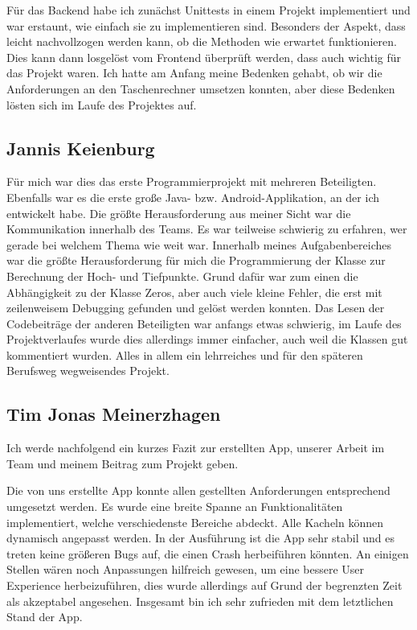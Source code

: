 Für das Backend habe ich zunächst Unittests in einem Projekt implementiert und war erstaunt, wie einfach sie zu implementieren sind. Besonders der Aspekt, dass leicht nachvollzogen werden kann, ob die Methoden wie erwartet funktionieren. Dies kann dann losgelöst vom Frontend überprüft werden, dass auch wichtig für das Projekt waren.
Ich hatte am Anfang meine Bedenken gehabt, ob wir die Anforderungen an den Taschenrechner umsetzen konnten, aber diese Bedenken lösten sich im Laufe des Projektes auf.

\clearpage

\subsection{Jannis Keienburg}
Für mich war dies das erste Programmierprojekt mit mehreren Beteiligten. Ebenfalls war es die erste große Java- bzw. Android-Applikation, an der ich entwickelt habe. Die größte Herausforderung aus meiner Sicht war die Kommunikation innerhalb des Teams. Es war teilweise schwierig zu erfahren, wer gerade bei welchem Thema wie weit war. Innerhalb meines Aufgabenbereiches war die größte Herausforderung für mich die Programmierung der Klasse zur Berechnung der Hoch- und Tiefpunkte. Grund dafür war zum einen die Abhängigkeit zu der Klasse Zeros, aber auch viele kleine Fehler, die erst mit zeilenweisem Debugging gefunden und gelöst werden konnten. Das Lesen der Codebeiträge der anderen Beteiligten war anfangs etwas schwierig, im Laufe des Projektverlaufes wurde dies allerdings immer einfacher, auch weil die Klassen gut kommentiert wurden. Alles in allem ein lehrreiches und für den späteren Berufsweg wegweisendes Projekt.

\clearpage

\subsection{Tim Jonas Meinerzhagen}
Ich werde nachfolgend ein kurzes Fazit zur erstellten App, unserer Arbeit im Team und meinem Beitrag zum Projekt geben.

Die von uns erstellte App konnte allen gestellten Anforderungen entsprechend umgesetzt werden. Es wurde eine breite Spanne an Funktionalitäten implementiert, welche verschiedenste Bereiche abdeckt. Alle Kacheln können dynamisch angepasst werden. In der Ausführung ist die App sehr stabil und es treten keine größeren Bugs auf, die einen Crash herbeiführen könnten. An einigen Stellen wären noch Anpassungen hilfreich gewesen, um eine bessere User Experience herbeizuführen, dies wurde allerdings auf Grund der begrenzten Zeit als akzeptabel angesehen. Insgesamt bin ich sehr zufrieden mit dem letztlichen Stand der App.

